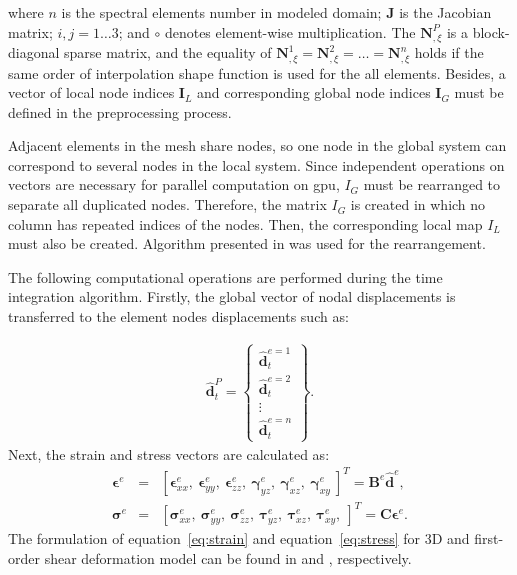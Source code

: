 where $n$ is the spectral elements number in modeled domain; \textbf{J} is the Jacobian matrix; $i,j=1\ldots3$; and $\circ$ denotes element-wise multiplication.
The $\textbf{N}^P_{,\xi}$ is a block-diagonal sparse matrix, and the equality of $\textbf{N}^1_{,\xi}=\textbf{N}^2_{,\xi}=\ldots=\textbf{N}^n_{,\xi}$ holds if the same order of interpolation shape function is used for the all elements.
Besides, a vector of local node indices $\textbf{I}_L$ and corresponding global node indices $\textbf{I}_G$ must be defined in the preprocessing process.

Adjacent elements in the mesh share nodes, so one node in the global system can correspond to several nodes in the local system.
Since independent operations on vectors are necessary for parallel computation on \ac{gpu}, $I_{G}$ must be rearranged to separate all duplicated nodes.
Therefore, the matrix $I_{G}$ is created in which no column has repeated indices of the nodes.
Then, the corresponding local map $I_{L}$ must also be created.
Algorithm presented in \cite{kudela2016parallel} was used for the rearrangement.

The following computational operations are performed during the time integration algorithm. Firstly, the global vector of nodal displacements is transferred to the element nodes displacements such as:

\begin{eqnarray}
	\widehat{\textbf{d}}_t^P = \left\{ \begin{array}{c}
		\widehat{\textbf{d}}_t^{e=1}\\
		\widehat{\textbf{d}}_t^{e=2}\\
		\vdots\\
		\widehat{\textbf{d}}_t^{e=n} \end{array}\right\}.
\end{eqnarray}
Next, the strain and stress vectors are calculated as:
\begin{eqnarray}
	\label{eq:strain}
	\boldsymbol{\epsilon}^e & = & \left[\boldsymbol{\epsilon}^e_{xx},\ \boldsymbol{\epsilon}^e_{yy},\ \boldsymbol{\epsilon}^e_{zz},\ \boldsymbol{\gamma}^e_{yz},\ \boldsymbol{\gamma}^e_{xz},\ \boldsymbol{\gamma}^e_{xy}\ \right]^T=\textbf{B}^e\widehat{\textbf{d}}^e,\\
	\label{eq:stress}
	\boldsymbol{\sigma}^e & = & \left[\boldsymbol{\sigma}^e_{xx},\ \boldsymbol{\sigma}^e_{yy},\ \boldsymbol{\sigma}^e_{zz},\ \boldsymbol{\tau}^e_{yz},\ \boldsymbol{\tau}^e_{xz},\ \boldsymbol{\tau}^e_{xy},\ \right]^T=\textbf{C}\boldsymbol{\epsilon}^e.
\end{eqnarray}
The formulation of equation~\ref{eq:strain} and equation~\ref{eq:stress} for 3D and first-order shear deformation model can be found in \cite{kudela2016parallel} and \cite{kudela2020parallel}, respectively.

